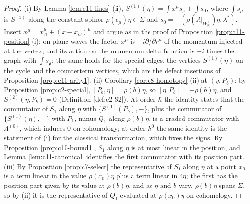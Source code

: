 \begin{proof}
(i) By Lemma \ref{lem:c11-lines} (ii), $S^{(1)}(\eta)=\int x^\mu s_\mu+\int s_0$, where $\int s_\mu$ is $S^{(1)}$ along the constant spinor $\rho(e_\mu)\eta\in\Sigma$ and $s_0=-(\rho(A|_{W_{\mathbb R}^\perp})\eta,\lambda^*)$. Insert $x^\mu=x_O^\mu+(x-x_O)^\mu$ and argue as in the proof of Proposition \ref{prop:c11-position} (i): on plane waves the factor $x^\mu$ is $-i\partial/\partial r^\mu$ of the momentum injected at the vertex, and its action on the momentum delta function is $-i$ times the graph with $\int s_\mu$; the same holds for the special edges, the vertices $S^{(1)}(\eta)$ on the cycle and the counterterm vertices, which are the defect insertions of Proposition \ref{prop:c10-arity1}. (ii) Corollary \ref{cor:c8-homotopy} (ii) at $(\eta,P_b)$: by Proposition \ref{prop:c2-special}, $[P_b,\eta]=\rho(b)\eta$, so $[\eta,P_b]=-\rho(b)\eta$, and $S^{(2)}(\eta,P_b)=0$ (Definition \ref{def:c2-S2}). At order $\hbar$ the identity states that the commutator of $S_1$ along $\eta$ with $\{S^{(1)}(P_b),-\}$, plus the commutator of $\{S^{(1)}(\eta),-\}$ with $P_1$, minus $Q_1$ along $\rho(b)\eta$, is a graded commutator with $\Lambda^{(0)}$, which induces $0$ on cohomology; at order $\hbar^0$ the same identity is the statement of (i) for the classical transformation, which fixes the signs. By Proposition \ref{prop:c10-bound1}, $S_1$ along $\eta$ is at most linear in the position, and Lemma \ref{lem:c11-canonical} identifies the first commutator with its position part. (iii) By Proposition \ref{prop:c7-select} the representative of $S_1$ along $\eta$ at a point $x_0$ is a term linear in the value $\rho(x_0)\eta$ plus a term linear in $4\eta$; the first has the position part given by its value at $\rho(b)\eta$, and as $\eta$ and $b$ vary, $\rho(b)\eta$ spans $\Sigma$, so by (ii) it is the representative of $Q_1$ evaluated at $\rho(x_0)\eta$ on cohomology.
\end{proof}

